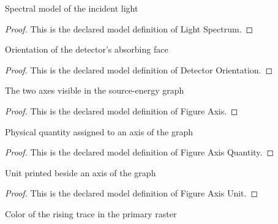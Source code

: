 \begin{definition}
  \label{def:physics:phyx-mini-0588:phyxminiproblems-problemphyxmini0588-lightspectrum}
  Spectral model of the incident light
\end{definition}
\begin{proof}
  This is the declared model definition of Light Spectrum.
\end{proof}
\begin{definition}
  \label{def:physics:phyx-mini-0588:phyxminiproblems-problemphyxmini0588-detectororientation}
  Orientation of the detector's absorbing face
\end{definition}
\begin{proof}
  This is the declared model definition of Detector Orientation.
\end{proof}
\begin{definition}
  \label{def:physics:phyx-mini-0588:phyxminiproblems-problemphyxmini0588-figureaxis}
  The two axes visible in the source-energy graph
\end{definition}
\begin{proof}
  This is the declared model definition of Figure Axis.
\end{proof}
\begin{definition}
  \label{def:physics:phyx-mini-0588:phyxminiproblems-problemphyxmini0588-figureaxisquantity}
  Physical quantity assigned to an axis of the graph
\end{definition}
\begin{proof}
  This is the declared model definition of Figure Axis Quantity.
\end{proof}
\begin{definition}
  \label{def:physics:phyx-mini-0588:phyxminiproblems-problemphyxmini0588-figureaxisunit}
  Unit printed beside an axis of the graph
\end{definition}
\begin{proof}
  This is the declared model definition of Figure Axis Unit.
\end{proof}
\begin{definition}
  \label{def:physics:phyx-mini-0588:phyxminiproblems-problemphyxmini0588-figuretracecolor}
  Color of the rising trace in the primary raster
\end{definition}
